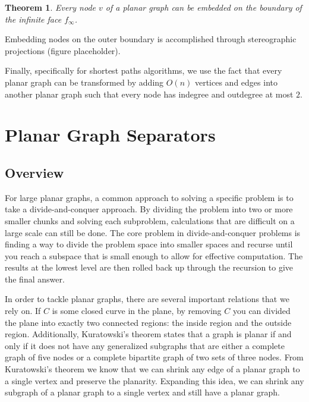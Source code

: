 \documentclass[12pt]{article}
\newtheorem{theorem}{Theorem}[section]
\begin{document}
\begin{theorem}
  Every node $v$ of a planar graph can be embedded on the boundary of the infinite face $f_{\infty}$.
\end{theorem}

Embedding nodes on the outer boundary is accomplished through stereographic projections (figure placeholder).

Finally, specifically for shortest paths algorithms, we use the fact that every planar graph can be transformed by adding $O(n)$ vertices and edges into another planar graph such that every node has indegree and outdegree at most $2$.

\section{Planar Graph Separators}
\label{sec:graph-sep}


    \subsection{Overview}
    \label{sec:graph-sep-overview}

    For large planar graphs, a common approach to solving a specific problem is to take a divide-and-conquer approach. By dividing the problem into two or more smaller chunks and solving each subproblem, calculations that are difficult on a large scale can still be done. The core problem in divide-and-conquer problems is finding a way to divide the problem space into smaller spaces and recurse until you reach a subspace that is small enough to allow for effective computation. The results at the lowest level are then rolled back up through the recursion to give the final answer.

    In order to tackle planar graphs, there are several important relations that we rely on. If $C$ is some closed curve in the plane, by removing $C$ you can divided the plane into exactly two connected regions: the inside region and the outside region. Additionally, Kuratowski's theorem states that a graph is planar if and only if it does not have any generalized subgraphs that are either a complete graph of five nodes or a complete bipartite graph of two sets of three nodes. From Kuratowski's theorem we know that we can shrink any edge of a planar graph to a single vertex and preserve the planarity. Expanding this idea, we can shrink any subgraph of a planar graph to a single vertex and still have a planar graph.
\end{document}
